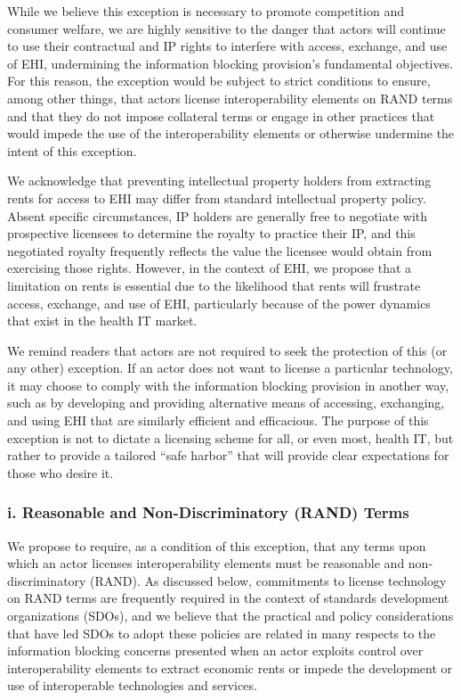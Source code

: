 \documentclass[twoside,11pt]{article}
\begin{document}
          While we believe this exception is necessary to promote competition and consumer welfare, we are highly sensitive to the danger that actors will continue to use their contractual and IP rights to interfere with access, exchange, and use of EHI, undermining the information blocking provision's fundamental objectives. For this reason, the exception would be subject to strict conditions to ensure, among other things, that actors license interoperability elements on RAND terms and that they do not impose collateral terms or engage in other practices that would impede the use of the interoperability elements or otherwise undermine the intent of this exception.


          We acknowledge that preventing intellectual property holders from extracting rents for access to EHI may differ from standard intellectual property policy. Absent specific circumstances, IP holders are generally free to negotiate with prospective licensees to determine the royalty to practice their IP, and this negotiated royalty frequently reflects the value the licensee would obtain from exercising those rights. However, in the context of EHI, we propose that a limitation on rents is essential due to the likelihood that rents will frustrate access, exchange, and use of EHI, particularly because of the power dynamics that exist in the health IT market.


          We remind readers that actors are not required to seek the protection of this (or any other) exception. If an actor does not want to license a particular technology, it may choose to comply with the information blocking provision in another way, such as by developing and providing alternative means of accessing, exchanging, and using EHI that are similarly efficient and efficacious. The purpose of this exception is not to dictate a licensing scheme for all, or even most, health IT, but rather to provide a tailored “safe harbor” that will provide clear expectations for those who desire it.


          \subsubsection{i. Reasonable and Non-Discriminatory (RAND) Terms}

          We propose to require, as a condition of this exception, that any terms upon which an actor licenses interoperability elements must be reasonable and non-discriminatory (RAND). As discussed below, commitments to license technology on RAND terms are frequently required in the context of standards development organizations (SDOs), and we believe that the practical and policy considerations that have led SDOs to adopt these policies are related in many respects to the information blocking concerns presented when an actor exploits control over interoperability elements to extract economic rents or impede the development or use of interoperable technologies and services.
\end{document}
